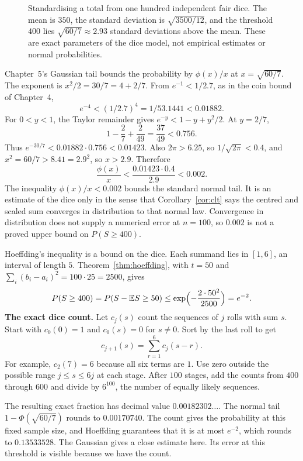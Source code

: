 \begin{figure}[ht]
\centering
{}
\caption{Standardising a total from one hundred independent fair dice. The mean is $350$, the standard deviation is $\sqrt{3500/12}$, and the threshold $400$ lies $\sqrt{60/7}\approx2.93$ standard deviations above the mean. These are exact parameters of the dice model, not empirical estimates or normal probabilities.}
\label{fig:dicez}
\end{figure}

Chapter~5's Gaussian tail bounds the probability by $\phi(x)/x$ at $x=\sqrt{60/7}$. The exponent is $x^2/2=30/7=4+2/7$. From $e^{-1}<1/2.7$, as in the coin bound of Chapter~4,
\[
 e^{-4}<(1/2.7)^4=1/53.1441<0.01882.
\]
For $0<y<1$, the Taylor remainder gives $e^{-y}<1-y+y^2/2$. At $y=2/7$,
\[
 1-\frac27+\frac{2}{49}=\frac{37}{49}<0.756.
\]
Thus $e^{-30/7}<0.01882\cdot0.756<0.01423$. Also $2\pi>6.25$, so $1/\sqrt{2\pi}<0.4$, and $x^2=60/7>8.41=2.9^2$, so $x>2.9$. Therefore
\[
 \frac{\phi(x)}{x}<\frac{0.01423\cdot0.4}{2.9}<0.002.
\]
The inequality $\phi(x)/x<0.002$ bounds the standard normal tail. It is an estimate of the dice only in the sense that Corollary~\ref{cor:clt} says the centred and scaled sum converges in distribution to that normal law. Convergence in distribution does not supply a numerical error at $n=100$, so $0.002$ is not a proved upper bound on $P(S\ge 400)$.

Hoeffding's inequality is a bound on the dice. Each summand lies in $[1,6]$, an interval of length $5$. Theorem~\ref{thm:hoeffding}, with $t=50$ and $\sum_i(b_i-a_i)^2=100\cdot25=2500$, gives
\[
 P(S\ge 400)=P(S-\mathbb E S\ge 50)\le\exp\Bigl(-\frac{2\cdot 50^2}{2500}\Bigr)=e^{-2}.
\]
\textbf{The exact dice count.} Let $c_j(s)$ count the sequences of $j$ rolls with sum $s$. Start with $c_0(0)=1$ and $c_0(s)=0$ for $s\ne0$. Sort by the last roll to get
\[
c_{j+1}(s)=\sum_{r=1}^6 c_j(s-r).
\]
For example, $c_2(7)=6$ because all six terms are $1$. Use zero outside the possible range $j\le s\le6j$ at each stage. After $100$ stages, add the counts from $400$ through $600$ and divide by $6^{100}$, the number of equally likely sequences.

The resulting exact fraction has decimal value $0.00182302\ldots$. The normal tail $1-\Phi(\sqrt{60/7})$ rounds to $0.00170740$. The count gives the probability at this fixed sample size, and Hoeffding guarantees that it is at most $e^{-2}$, which rounds to $0.13533528$. The Gaussian gives a close estimate here. Its error at this threshold is visible because we have the count.

